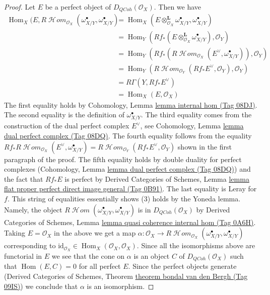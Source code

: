 \documentclass{amsart}
\theoremstyle{plain}
\theoremstyle{definition}
\theoremstyle{remark}
\numberwithin{equation}{subsection}
\def\Hom{\mathop{\mathrm{Hom}}\nolimits}
\def\SheafHom{\mathop{\mathcal{H}\!\mathit{om}}\nolimits}
\def\QCoh{\mathit{QCoh}}
\begin{document}
\begin{proof}
\medskip\noindent
Let $E$ be a perfect object of $D_\QCoh(\mathcal{O}_X)$. Then
we have
\begin{align*}
\Hom_X(E, R\SheafHom_{\mathcal{O}_X}(\omega_{X/Y}^\bullet, \omega_{X/Y}^\bullet)
& =
\Hom_X(E \otimes_{\mathcal{O}_X}^\mathbf{L} \omega_{X/Y}^\bullet,
\omega_{X/Y}^\bullet) \\
& =
\Hom_Y(Rf_*(E \otimes_{\mathcal{O}_X}^\mathbf{L} \omega_{X/Y}^\bullet),
\mathcal{O}_Y) \\
& =
\Hom_Y(Rf_*(R\SheafHom_{\mathcal{O}_X}(E^\vee, \omega_{X/Y}^\bullet)),
\mathcal{O}_Y) \\
& =
\Hom_Y(R\SheafHom_{\mathcal{O}_Y}(Rf_*E^\vee, \mathcal{O}_Y),
\mathcal{O}_Y) \\
& =
R\Gamma(Y, Rf_*E^\vee) \\
& =
\Hom_X(E, \mathcal{O}_X)
\end{align*}
The first equality holds by Cohomology, Lemma
\href{https://stacks.math.columbia.edu/tag/08DJ}{lemma internal hom (Tag 08DJ)}.
The second equality is the definition of $\omega_{X/Y}^\bullet$.
The third equality comes from the construction of the dual perfect
complex $E^\vee$, see Cohomology, Lemma
\href{https://stacks.math.columbia.edu/tag/08DQ}{lemma dual perfect complex (Tag 08DQ)}.
The fourth equality follows from the equality
$Rf_*R\SheafHom_{\mathcal{O}_X}(E^\vee, \omega_{X/Y}^\bullet) =
R\SheafHom_{\mathcal{O}_Y}(Rf_*E^\vee, \mathcal{O}_Y)$
shown in the first paragraph of the proof.
The fifth equality holds by double duality for perfect complexes
(Cohomology, Lemma
\href{https://stacks.math.columbia.edu/tag/08DQ}{lemma dual perfect complex (Tag 08DQ)})
and the fact that $Rf_*E$ is perfect by
Derived Categories of Schemes, Lemma
\href{https://stacks.math.columbia.edu/tag/0B91}{lemma flat proper perfect direct image general (Tag 0B91)}.
The last equality is Leray for $f$.
This string of equalities essentially shows (3)
holds by the Yoneda lemma. Namely, the object
$R\SheafHom(\omega_{X/Y}^\bullet, \omega_{X/Y}^\bullet)$
is in $D_\QCoh(\mathcal{O}_X)$ by Derived Categories of Schemes, Lemma
\href{https://stacks.math.columbia.edu/tag/0A6H}{lemma quasi coherence internal hom (Tag 0A6H)}.
Taking $E = \mathcal{O}_X$ in the above we get a map
$\alpha : \mathcal{O}_X \to
R\SheafHom_{\mathcal{O}_X}(\omega_{X/Y}^\bullet, \omega_{X/Y}^\bullet)$
corresponding to
$\text{id}_{\mathcal{O}_X} \in \Hom_X(\mathcal{O}_X, \mathcal{O}_X)$.
Since all the isomorphisms above are functorial in $E$ we
see that the cone on $\alpha$ is an object $C$ of $D_\QCoh(\mathcal{O}_X)$
such that $\Hom(E, C) = 0$ for all perfect $E$.
Since the perfect objects generate
(Derived Categories of Schemes, Theorem
\href{https://stacks.math.columbia.edu/tag/09IS}{theorem bondal van den Bergh (Tag 09IS)})
we conclude that $\alpha$ is an isomorphism.
\end{proof}
\end{document}
